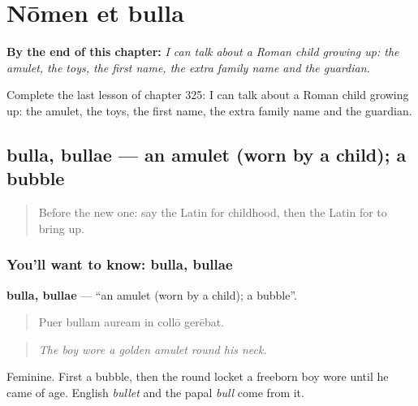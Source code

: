 
\chapter{Nōmen et bulla}
\label{ch:la-nomen-et-bulla}

\begin{chapteropening}
\textbf{By the end of this chapter:} \emph{I can talk about a Roman child growing up: the amulet, the toys, the first name, the extra family name and the guardian.}

Complete the last lesson of chapter 325: I can talk about a Roman child growing up: the amulet, the toys, the first name, the extra family name and the guardian.
\end{chapteropening}

\section[bulla, bullae]{bulla, bullae — an amulet (worn by a child); a bubble}

\label{lesson:LA-C325-bulla}



\begin{quote}
Before the new one: say the Latin for childhood, then the Latin for to bring up.
\end{quote}

\subsection*{You'll want to know: bulla, bullae}
\textbf{bulla, bullae} — \textquotedblleft{}an amulet (worn by a child); a bubble\textquotedblright{}.

\begin{quote}
Puer bullam auream in collō gerēbat.
\end{quote}

\begin{quote}
\emph{The boy wore a golden amulet round his neck.}
\end{quote}

Feminine. First a bubble, then the round locket a freeborn boy wore until he came of age. English \emph{bullet} and the papal \emph{bull} come from it.


